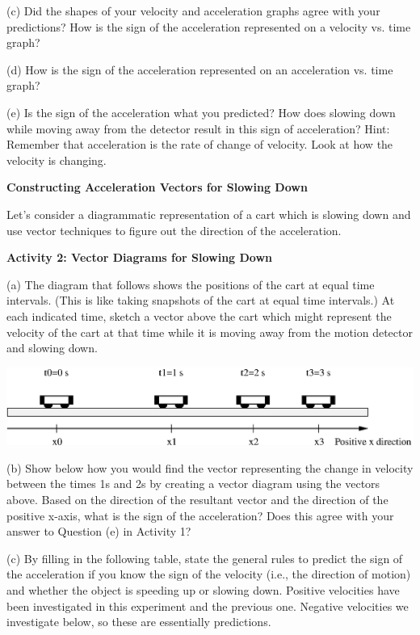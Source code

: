 (c) Did the shapes of your velocity and acceleration graphs agree with your
predictions? How is the sign of the acceleration represented on a velocity vs.
time graph? 
\answerspace{15mm}

(d) How is the sign of the acceleration represented on an acceleration vs. time
graph? 
\answerspace{15mm}

\pagebreak[3]
(e) Is the sign of the acceleration what you predicted? How does slowing down
while moving away from the detector result in this sign of acceleration? Hint:
Remember that acceleration is the rate of change of velocity. Look at how the
velocity is changing.
\answerspace{20mm}

\textbf{Constructing Acceleration Vectors for Slowing Down }

Let's consider a diagrammatic representation of a cart which is slowing down
and use vector techniques to figure out the direction of the acceleration.

\textbf{Activity 2: Vector Diagrams for Slowing Down} 

(a) The diagram that follows shows the positions of the cart at equal time intervals.
(This is like taking snapshots of the cart at equal time intervals.) At each
indicated time, sketch a vector above the cart which might represent the velocity
of the cart at that time while it is moving away from the motion detector and
slowing down.

\vspace{0.3cm}
{\par\centering \includegraphics{slowing/slowing_fig2.eps} \par}
\vspace{0.3cm}

(b) Show below how you would find the vector representing the change in velocity
between the times 1s and 2s by creating a vector diagram using the vectors 
 above. Based on the direction of the resultant vector and the direction of 
the positive x-axis, what is the sign of the acceleration? 
Does this agree with your answer to Question (e) in Activity 1?
\answerspace{20mm}

(c) By filling in the following table, state the general rules to predict the 
sign of the acceleration if you know the sign of the velocity (i.e., the 
direction of motion) and whether the object is speeding up or slowing down. 
Positive velocities have been investigated in this experiment and the previous 
one. Negative velocities we investigate below, so these are essentially 
predictions.


